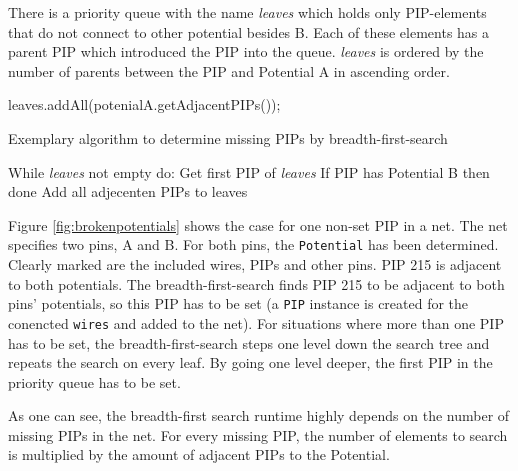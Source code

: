 There is a priority queue with the name \textit{leaves} which holds only PIP-elements that do not connect to other potential besides B. 
Each of these elements has a parent PIP which introduced the PIP into the queue. \textit{leaves} is ordered by the number of parents between the PIP and Potential A in ascending order.

\begin{algorithm}[h]
	leaves.addAll(potenialA.getAdjacentPIPs());\\
 \caption{Exemplary algorithm to determine missing PIPs by breadth-first-search}
 \label{alg:breadth-first-search}
\end{algorithm}


While \textit{leaves} not empty do:
	Get first PIP of \textit{leaves}
	If PIP has Potential B then done
	Add all adjecenten PIPs to leaves

Figure \ref{fig:brokenpotentials} shows the case for one non-set PIP in a net. The net specifies two pins, A and B. For both pins, the \texttt{Potential} has been determined. Clearly marked are the included wires, PIPs and other pins. PIP 215 is adjacent to both potentials. The breadth-first-search finds PIP 215 to be adjacent to both pins' potentials, so this PIP has to be set (a \texttt{PIP} instance is created for the conencted \texttt{wires} and added to the net). For situations where more than one PIP has to be set, the breadth-first-search steps one level down the search tree and repeats the search on every leaf. By going one level deeper, the first PIP in the priority queue has to be set.

As one can see, the breadth-first search runtime highly depends on the number of missing PIPs in the net. For every missing PIP, the number of elements to search is multiplied by the amount of adjacent PIPs to the Potential.

